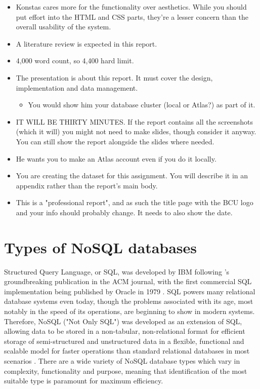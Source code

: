 \documentclass[12pt]{report}
\begin{document}
\begin{itemize}
    \item Konstas cares more for the functionality over aesthetics. While you should put effort into 
    the HTML and CSS parts, they're a lesser concern than the overall usability of the system.
    \item A literature review is expected in this report.
    \item 4,000 word count, so 4,400 hard limit.
    \item The presentation is about this report. It must cover the design, implementation and data management.
    \begin{itemize}
        \item You would show him your database cluster (local or Atlas?) as part of it.
    \end{itemize}
    \item IT WILL BE THIRTY MINUTES. If the report contains all the screenshots (which it will) you might not need 
    to make slides, though consider it anyway. You can still show the report alongside the slides where needed.
    \item He wants you to make an Atlas account even if you do it locally.
    \item You are creating the dataset for this assignment. You will describe it in an appendix rather than 
    the report's main body.
    \item This is a "professional report", and as such the title page with the BCU logo and your info should 
    probably change. It needs to also show the date.
\end{itemize}

\chapter{Types of NoSQL databases}

\noindent Structured Query Language, or SQL, was developed by IBM following \textcite{codd_relational_1970}'s groundbreaking 
publication in the ACM journal, with the first commercial SQL implementation being published by Oracle in 1979 \autocite{oracle_history_nodate}.
SQL powers many relational database systems even today, though the problems associated with its age, most notably in 
the speed of its operations, are beginning to show in modern systems. Therefore, NoSQL ("Not Only SQL") was developed as 
an extension of SQL, allowing data to be stored in a non-tabular, non-relational format for efficient storage of
semi-structured and unstructured data in a flexible, functional and scalable model for faster operations than standard 
relational databases in most scenarios \autocite{google_cloud_what_nodate, aws_what_nodate}. There are a wide variety of NoSQL 
database types which vary in complexity, functionality and purpose, meaning that identification of the most suitable type is paramount 
for maximum efficiency. 
\end{document}

